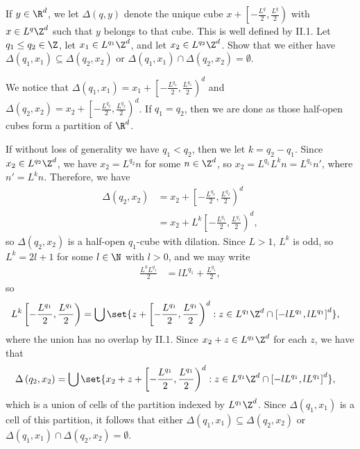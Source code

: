 \documentclass[10pt]{mypackage}
\begin{document}
\begin{problem}[Problem II.2]
  If $y\in \R^d$, we let $\Delta\left( q,y \right)$ denote the unique cube $x + \left[ -\frac{L^q}{2},\frac{L^q}{2} \right)$ with $x\in L^q\Z^d$ such that $y$ belongs to that cube. This is well defined by II.1. Let $q_1\leq q_2\in \Z$, let $x_1\in L^{q_1}\Z^d$, and let $x_2\in L^{q_2}\Z^d$. Show that we either have $\Delta\left( q_1,x_1 \right)\subseteq \Delta\left( q_2,x_2 \right)$ or $\Delta\left( q_1,x_1 \right)\cap \Delta\left( q_2,x_2 \right) = \emptyset$.
\end{problem}
\begin{solution}
  We notice that $\Delta\left( q_1,x_1 \right) = x_1 + \left[ -\frac{L^{q_1}}{2},\frac{L^{q_1}}{2} \right)^{d}$ and $\Delta\left( q_2,x_2 \right) = x_2 + \left[ -\frac{L^{q_2}}{2},\frac{L^{q_2}}{2} \right)^{d}$. If $q_1 = q_2$, then we are done as those half-open cubes form a partition of $\R^d$.

  If without loss of generality we have $q_1 < q_2$, then we let $k = q_2 - q_1$. Since $x_2\in L^{q_2}\Z^d$, we have $x_2 = L^{q_2}n$ for some $n\in \Z^d$, so $x_2 = L^{q_1}L^{k}n = L^{q_1}n'$, where $n' = L^{k}n$. Therefore, we have
  \begin{align*}
    \Delta\left( q_2,x_2 \right) &= x_2 + \left[ -\frac{L^{q_2}}{2},\frac{L^{q_2}}{2} \right)^{d}\\
                                 &= x_2 + L^{k} \left[ -\frac{L^{q_1}}{2},\frac{L^{q_1}}{2} \right)^{d},
  \end{align*}
  so $\Delta\left( q_2,x_2 \right)$ is a half-open $q_1$-cube with dilation. Since $L > 1$, $L^{k}$ is odd, so $L^{k} = 2l + 1$ for some $l\in \N$ with $l > 0$, and we may write
  \begin{align*}
    \frac{L^{k}L^{q_1}}{2} &= lL^{q_1} + \frac{L^{q_1}}{2},
  \end{align*}
  so
  \begin{align*}
    L^{k}\left[ -\frac{L^{q_1}}{2},\frac{L^{q_1}}{2} \right) &= \bigcup\set{ z + \left[ -\frac{L^{q_1}}{2},\frac{L^{q_1}}{2} \right)^{d} : z\in L^{q_1}\Z^d\cap \left[ -lL^{q_1},lL^{q_1} \right]^{d} },
  \end{align*}
  where the union has no overlap by II.1. Since $x_2 + z\in L^{q_1}\Z^d$ for each $z$, we have that 
  \begin{align*}
    \Delta\left( q_2,x_2 \right) &= \bigcup\set{ x_2 + z + \left[ -\frac{L^{q_1}}{2},\frac{L^{q_1}}{2} \right)^{d} : z\in L^{q_1}\Z^d\cap \left[ -lL^{q_1},lL^{q_1} \right]^{d} },
  \end{align*}
  which is a union of cells of the partition indexed by $L^{q_1}\Z^d$. Since $\Delta\left( q_1,x_1 \right)$ is a cell of this partition, it follows that either $\Delta\left( q_1,x_1 \right)\subseteq \Delta\left( q_2,x_2 \right)$ or $\Delta\left( q_1,x_1 \right)\cap \Delta\left( q_2,x_2 \right) = \emptyset$.
\end{solution}
\end{document}
